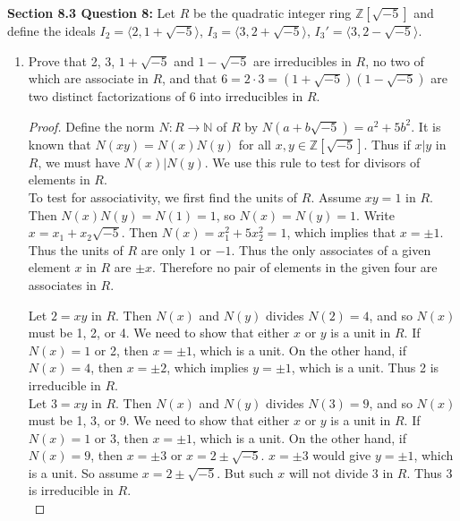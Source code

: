 \documentclass{article}
\begin{document}
\textbf{Section 8.3 Question 8:} Let $R$ be the quadratic integer ring
  $\mathbb{Z}[\sqrt{-5}]$ and define the ideals
  $I_2=\langle2,1+\sqrt{-5}\rangle$, $I_3=\langle3,2+\sqrt{-5}\rangle$,
  $I_3'=\langle3,2-\sqrt{-5}\rangle$.

  \begin{enumerate}[label={\bf(\alph*)}]
    \item Prove that 2, 3, $1+\sqrt{-5}$ and $1-\sqrt{-5}$ are irreducibles
      in $R$, no two of which are associate in $R$, and that
      $6=2\cdot3=(1+\sqrt{-5})(1-\sqrt{-5})$ are two distinct
      factorizations of 6 into irreducibles in $R$.

      \begin{proof}
        Define the norm $N:R\rightarrow\mathbb{N}$ of $R$ by
        $N(a+b\sqrt{-5})=a^2+5b^2$. It is known that $N(xy)=N(x)N(y)$ for
        all $x,y\in\mathbb{Z}[\sqrt{-5}]$. Thus if $x|y$ in $R$, we must
        have $N(x)|N(y)$. We use this rule to test for divisors of elements
        in $R$. \\

        To test for associativity, we first find the units of $R$.
        Assume $xy=1$ in $R$. Then $N(x)N(y)=N(1)=1$, so $N(x)=N(y)=1$.
        Write $x=x_1+x_2\sqrt{-5}$. Then $N(x)=x_1^2+5x_2^2=1$, which
        implies that $x=\pm1$. Thus the units of $R$ are only $1$ or $-1$.
        Thus the only associates of a given element $x$ in $R$ are $\pm x$.
        Therefore no pair of elements in the given four are associates in
        $R$.

        Let $2=xy$ in $R$. Then $N(x)$ and $N(y)$ divides $N(2)=4$, and so
        $N(x)$ must be 1, 2, or 4. We need to show that either $x$ or $y$
        is a unit in $R$. If $N(x)=1$ or 2, then $x=\pm1$, which is a unit.
        On the other hand, if $N(x)=4$, then $x=\pm2$, which implies
        $y=\pm1$, which is a unit. Thus 2 is irreducible in $R$. \\

        Let $3=xy$ in $R$. Then $N(x)$ and $N(y)$ divides $N(3)=9$, and so
        $N(x)$ must be 1, 3, or 9. We need to show that either $x$ or $y$
        is a unit in $R$. If $N(x)=1$ or 3, then $x=\pm1$, which is a unit.
        On the other hand, if $N(x)=9$, then $x=\pm3$ or $x=2\pm\sqrt{-5}$.
        $x=\pm3$ would give $y=\pm1$, which is a unit. So assume
        $x=2\pm\sqrt{-5}$. But such $x$ will not divide 3 in $R$. Thus 3 is
        irreducible in $R$. \\


\end{proof}
\end{enumerate}
\end{document}
